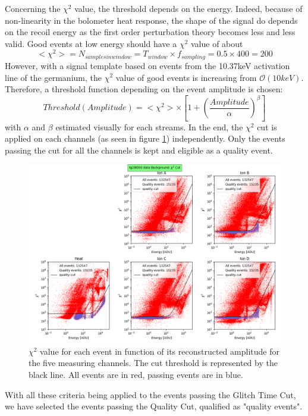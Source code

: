 Concerning the $\chi^2$ value, the threshold depends on the energy. Indeed, because of non-linearity in the bolometer heat response, the shape of the signal do depends on the recoil energy as the first order perturbation theory becomes less and less valid.
Good events at low energy should have a $\chi^2$ value of about
$$ <\chi^2> = N_{samples in window} = T_{window} \times f_{sampling} = 0.5 \times 400 = 200$$
However, with a signal template based on events from the 10.37keV activation line of the germanium, the $\chi^2$ value of good events is increasing from $\mathcal{O}(10keV)$.
Therefore, a threshold function depending on the event amplitude is chosen:
$$ Threshold(Amplitude) = <\chi^2> \times \left[ 1+ \left( \frac{Amplitude}{\alpha} \right)^\beta \right]$$
with $\alpha$ and $\beta$ estimated visually for each streams.
In the end, the $\chi^2$ cut is applied on each channels (as seen in figure \ref{fig:chi2-cut}) independently. Only the events passing the cut for all the channels is kept and eligible as a quality event.

\begin{figure}
\centering
\includegraphics[width=\linewidth,]{Figures/Neutron/chi2_cut.png}
\caption{$\chi^2$ value for each event in function of its reconstructed amplitude for the five measuring channels. The cut threshold is represented by the black line. All events are in red, passing events are in blue.}
\label{fig:chi2-cut}
\end{figure}

With all these criteria being applied to the events passing the Glitch Time Cut, we have selected the events passing the Quality Cut, qualified as "quality events".


